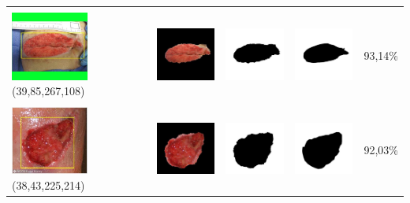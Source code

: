 \begin{table}[H]
\begin{tabular}{|m{1.0in}|m{1.0in}|m{1.0in}|m{1.0in}|m{0.6in}|}
		&  &  & \\
		\includegraphics[width=1.0in]{gambar/hasil_segmentasi/luka_merah/image_19_rect.jpg} {\centering\fontsize{10}{10}\selectfont(39,85,267,108)}&
		\includegraphics[width=1.0in]{gambar/hasil_segmentasi/luka_merah/result_19.jpg}&
		\includegraphics[width=1.0in]{gambar/hasil_segmentasi/luka_merah/mask_r_19.jpg}&
		\includegraphics[width=1.0in]{gambar/hasil_segmentasi/luka_merah/19_r.jpg}&
		93,14\% \\
		\hline
				
		&  &  & \\
		\includegraphics[width=1.0in]{gambar/hasil_segmentasi/luka_merah/image_20_rect.jpg} {\centering\fontsize{10}{10}\selectfont(38,43,225,214)}&
		\includegraphics[width=1.0in]{gambar/hasil_segmentasi/luka_merah/result_20.jpg}&
		\includegraphics[width=1.0in]{gambar/hasil_segmentasi/luka_merah/mask_r_20.jpg}&
		\includegraphics[width=1.0in]{gambar/hasil_segmentasi/luka_merah/20_r.jpg}&
		92,03\% \\
		\hline


\end{tabular}
\end{table}
